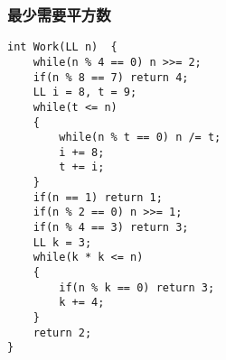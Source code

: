 \subsubsection{最少需要平方数}
\begin{verbatim}
int Work(LL n)  {  
    while(n % 4 == 0) n >>= 2;  
    if(n % 8 == 7) return 4;  
    LL i = 8, t = 9;  
    while(t <= n)  
    {  
        while(n % t == 0) n /= t;  
        i += 8;  
        t += i;  
    }  
    if(n == 1) return 1;  
    if(n % 2 == 0) n >>= 1;  
    if(n % 4 == 3) return 3;  
    LL k = 3;  
    while(k * k <= n)  
    {  
        if(n % k == 0) return 3;  
        k += 4;  
    }  
    return 2;  
}  
\end{verbatim}
